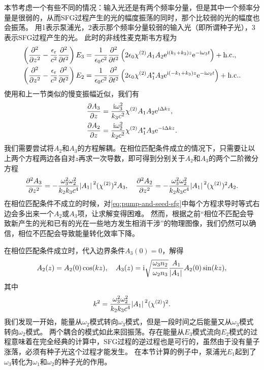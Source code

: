 本节考虑一个有些不同的情况：输入光还是有两个频率分量，但是其中一个频率分量是很弱的，从而SFG过程产生的光的幅度振荡的同时，那个比较弱的光的幅度也会振荡。
用1表示泵浦光，2表示那个频率分量较弱的输入光（即所谓种子光），3表示SFG过程产生的光。
此时的非线性麦克斯韦方程为
\[
    \begin{aligned}
        \left( \pdv[2]{z} - \frac{\epsilon_\text{r}}{c^2} \pdv[2]{t} \right) E_3 &= \frac{1}{\epsilon_0 c^2} \pdv[2]{t} \left( 2 \epsilon_0  \chi^{(2)} A_1 A_2 \mathrm{e}^{\mathrm{i} (k_1 + k_2) z} \mathrm{e}^{-\mathrm{i} \omega_3 t} \right) + \text{h.c.}, \\
        \left( \pdv[2]{z} - \frac{\epsilon_\text{r}}{c^2} \pdv[2]{t} \right) E_2 &= \frac{1}{\epsilon_0 c^2} \pdv[2]{t} \left( 2 \epsilon_0  \chi^{(2)} A_1^* A_3 \mathrm{e}^{\mathrm{i} (- k_1 + k_3) z} \mathrm{e}^{-\mathrm{i} \omega_2 t} \right) + \text{h.c.}.
    \end{aligned}
\]
使用和上一节类似的慢变振幅近似，我们有
\begin{equation}
    \begin{aligned}
        \pdv{A_3}{z} &= \frac{\mathrm{i} \omega_3^2}{k_3 c^2} \chi^{(2)} A_1 A_2 \mathrm{e}^{\mathrm{i} \Delta k z}, \\
        \pdv{A_2}{z} &= \frac{\mathrm{i} \omega_2^2}{k_2 c^2} \chi^{(2)} A_1^* A_3 \mathrm{e}^{- \mathrm{i} \Delta k z}.
    \end{aligned}
    \label{eq:pump-and-seed-sfg}
\end{equation}
我们需要尝试将$A_2$和$A_3$的方程解耦。在相位匹配条件成立的情况下，只需要让以上两个方程两边各自对$z$再求一次导数，即可得到分别关于$A_2$和$A_3$的两个二阶微分方程
\[
    \pdv[2]{A_3}{z} = - \frac{\omega_3^2 \omega_2^2}{k_2 k_3 c^4} \abs*{A_1}^2 (\chi^{(2)})^2 A_3, \quad \pdv[2]{A_2}{z} = - \frac{\omega_3^2 \omega_2^2}{k_2 k_3 c^4} \abs*{A_1}^2 (\chi^{(2)})^2 A_2.
\]
在相位匹配条件不成立的时候，对\eqref{eq:pump-and-seed-sfg}中每个方程求导时等式右边会多出来一个$A_2$或$A_3$项，让求解变得困难。
然而，根据之前“相位不匹配会导致新产生的光和已有的光在一些地方发生相消干涉”的物理图像，我们仍然可以确信，相位不匹配会导致能量转化效率下降。

在相位匹配条件成立时，代入边界条件$A_3(0) = 0$，解得
\begin{equation}
    A_2(z) = A_2(0) \cos(k z), \quad A_3(z) = \mathrm{i} \sqrt{\frac{\omega_3 n_2}{\omega_2 n_3}} \frac{A_1}{\abs*{A_1}} A_2(0) \sin(k z),
\end{equation}
其中
\begin{equation}
    k^2 = \frac{\omega_3^2 \omega_2^2}{k_2 k_3 c^4} \abs*{A_1}^2 (\chi^{(2)})^2. 
\end{equation}
我们发现一开始，能量从$\omega_2$模式转向$\omega_3$模式，但是一段时间之后能量又从$\omega_3$模式转向$\omega_2$模式。
两个耦合的模式如此来回振荡。存在能量从$E_3$模式流向$E_2$模式的过程意味着在完全经典的计算中，SFG过程的逆过程也是可行的，虽然由于没有量子涨落，必须有种子光这个过程才能发生。
在本节计算的例子中，泵浦光$E_1$起到了$\omega_3$转化为$\omega_1$和$\omega_2$的种子光的作用。

